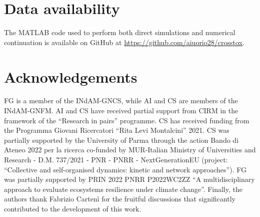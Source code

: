 \documentclass[11pt]{elsarticle}
\theoremstyle{plain}
\theoremstyle{definition}
\theoremstyle{myremark}
\begin{document}
\section*{Data availability} 
The MATLAB code used to perform both direct simulations and numerical continuation is available on GitHub at \href{https://github.com/aiuorio28/crosstox}{https://github.com/aiuorio28/crosstox}.


\section*{Acknowledgements} 
FG is a member of the INdAM-GNCS, while AI and CS are members of the INdAM-GNFM. AI and CS have received partial support from CIRM in the framework of the ``Research in pairs'' programme. CS has received funding from the Programma Giovani Ricercatori ``Rita Levi Montalcini'' 2021. CS was partially supported by the University of Parma through
the action Bando di Ateneo 2022 per la ricerca co-funded by MUR-Italian Ministry of Universities and Research - D.M. 737/2021 - PNR - PNRR - NextGenerationEU (project:
``Collective and self-organised dynamics: kinetic and network approaches''). FG was partially supported by PRIN 2022 PNRR P2022WC2ZZ ``A multidisciplinary approach to evaluate ecosystems resilience under climate change''. Finally, the authors thank Fabrizio Cartenì for the fruitful discussions that significantly contributed to the development of this work.


{}

\clearpage
\end{document}
